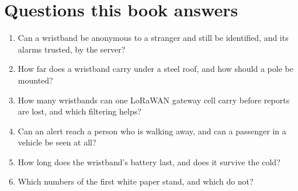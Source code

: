 \documentclass[11pt,a4paper,twoside,openany]{book}
\begin{document}
\section{Questions this book answers}
\begin{enumerate}
\item Can a wristband be anonymous to a stranger and still be identified, and its alarms trusted, by the server?
\item How far does a wristband carry under a steel roof, and how should a pole be mounted?
\item How many wristbands can one LoRaWAN gateway cell carry before reports are lost, and which filtering helps?
\item Can an alert reach a person who is walking away, and can a passenger in a vehicle be seen at all?
\item How long does the wristband's battery last, and does it survive the cold?
\item Which numbers of the first white paper stand, and which do not?
\end{enumerate}

\end{document}
